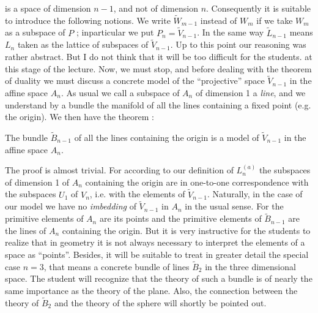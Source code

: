 is a space of dimension $n-1$, and not of dimension $n$. Consequently
it is suitable to introduce the following notions. We write
$\tilde{W}_{m-1}$ instead of $W_m$ if we take $W_m$ as a subspace of
$P$ ; in\pageoriginale particular we put $P_n = \tilde{V}_{n-1}$. In
the same way $\tilde{L}_{n-1}$ means $L_n$ taken as the lattice of
subspaces of $\tilde{V}_{n-1}$. Up to this point our reasoning was
rather abstract. But I do not think that it will be too difficult for
the students. at this stage of the lecture. Now, we must stop, and
before dealing with the theorem of duality we must discuss a concrete
model of the ``projective'' space $\tilde{V}_{n-1}$ in the affine
space $A_n$. As usual we call a subspace of $A_n$ of dimension 1 a
\textit{line}, and we understand by a bundle the manifold of all the
lines containing a fixed point (e.g. the origin). We then have the
theorem :

The bundle $\tilde{B}_{n-1}$ of all the lines containing the origin is
a model of $\tilde{V}_{n-1}$ in the affine space $A_n$.

The proof is almost trivial. For according to our definition of
$L^{(a)}_n$ the subspaces of dimension 1 of $A_n$ containing the
origin are in one-to-one correspondence with the subspaces $U_1$ of
$V_n$, i.e. with the elements of $\tilde{V}_{n-1}$. Naturally, in the
case of our model we have no \textit{imbedding} of $\tilde{V}_{n-1}$
in $A_n$ in the usual sense. For the primitive elements of $A_n$ are
its points and the primitive elements of $\tilde{B}_{n-1}$ are the
lines of $A_n$ containing the origin. But it is very instructive for
the students to realize that in geometry it is not always necessary to
interpret the elements of a space as ``points''. Besides, it will be
suitable to treat in greater detail the special case $n =3$, that
means a concrete bundle of lines $\tilde{B}_2$ in the three
dimensional space. The student will recognize that the theory of such
a bundle is of nearly the same importance as the theory of the
plane. Also, the connection between the theory of $\tilde{B}_2$ and
the theory of the sphere will shortly be pointed out. 

